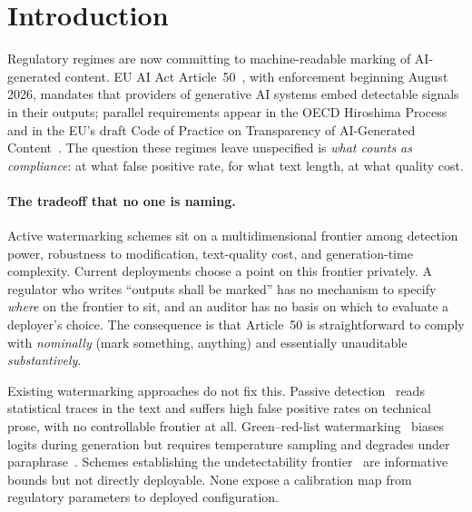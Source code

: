 \section{Introduction}
\label{sec:intro}

Regulatory regimes are now committing to machine-readable marking of
AI-generated content. EU AI Act Article~50~\citep{euaiact2024}, with
enforcement beginning August 2026, mandates that providers of
generative AI systems embed detectable signals in their outputs;
parallel requirements appear in the OECD Hiroshima
Process~\citep{oecdhiroshima2024} and in the EU's draft Code of
Practice on Transparency of AI-Generated
Content~\citep{eucodepractice2025}. The question these regimes leave
unspecified is \emph{what counts as compliance}: at what false
positive rate, for what text length, at what quality cost.

\paragraph{The tradeoff that no one is naming.}
Active watermarking schemes sit on a multidimensional frontier among
detection power, robustness to modification, text-quality cost, and
generation-time complexity. Current deployments choose a point on this
frontier privately. A regulator who writes ``outputs shall be marked''
has no mechanism to specify \emph{where} on the frontier to sit, and
an auditor has no basis on which to evaluate a deployer's choice. The
consequence is that Article~50 is straightforward to comply with
\emph{nominally} (mark something, anything) and essentially
unauditable \emph{substantively}.

Existing watermarking approaches do not fix this. Passive
detection~\citep{mitchell2023detectgpt,tian2023gptzero} reads
statistical traces in the text and suffers high false positive rates
on technical prose, with no controllable frontier at all.
Green--red-list watermarking~\citep{kirchenbauer2023watermark} biases
logits during generation but requires temperature sampling and
degrades under paraphrase~\citep{krishna2023paraphrasing}. Schemes
establishing the undetectability
frontier~\citep{christ2024undetectable} are informative bounds but
not directly deployable. None expose a calibration map from
regulatory parameters to deployed configuration.

